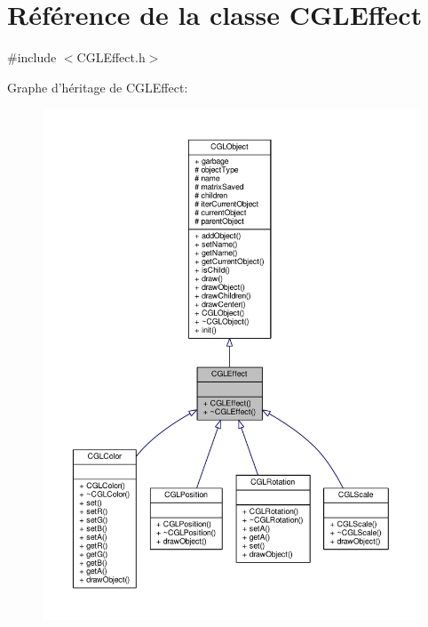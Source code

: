 \hypertarget{class_c_g_l_effect}{\section{Référence de la classe C\-G\-L\-Effect}
\label{class_c_g_l_effect}
}


{\ttfamily \#include $<$C\-G\-L\-Effect.\-h$>$}



Graphe d'héritage de C\-G\-L\-Effect\-:\nopagebreak
\begin{figure}[H]
\begin{center}
\leavevmode
\includegraphics[width=350pt]{d7/d88/class_c_g_l_effect__inherit__graph}
\end{center}
\end{figure}


